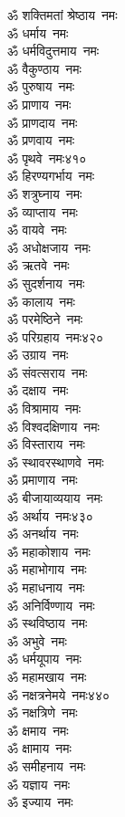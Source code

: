 \begin{multicols}{2}
\begin{flushleft}
ॐ शक्तिमतां श्रेष्ठाय~नमः\\
ॐ धर्माय~नमः\\
ॐ धर्मविदुत्तमाय~नमः\\
ॐ वैकुण्ठाय~नमः\\
ॐ पुरुषाय~नमः\\
ॐ प्राणाय~नमः\\
ॐ प्राणदाय~नमः\\
ॐ प्रणवाय~नमः\\
ॐ पृथवे~नमः\hfill ४१०\\
ॐ हिरण्यगर्भाय~नमः\\
ॐ शत्रुघ्नाय~नमः\\
ॐ व्याप्ताय~नमः\\
ॐ वायवे~नमः\\
ॐ अधोक्षजाय~नमः\\
ॐ ऋतवे~नमः\\
ॐ सुदर्शनाय~नमः\\
ॐ कालाय~नमः\\
ॐ परमेष्ठिने~नमः\\
ॐ परिग्रहाय~नमः\hfill ४२०\\
ॐ उग्राय~नमः\\
ॐ संवत्सराय~नमः\\
ॐ दक्षाय~नमः\\
ॐ विश्रामाय~नमः\\
ॐ विश्वदक्षिणाय~नमः\\
ॐ विस्ताराय~नमः\\
ॐ स्थावरस्थाणवे~नमः\\
ॐ प्रमाणाय~नमः\\
ॐ बीजायाव्ययाय~नमः\\
ॐ अर्थाय~नमः\hfill ४३०\\
ॐ अनर्थाय~नमः\\
ॐ महाकोशाय~नमः\\
ॐ महाभोगाय~नमः\\
ॐ महाधनाय~नमः\\
ॐ अनिर्विण्णाय~नमः\\
ॐ स्थविष्ठाय~नमः\\
ॐ अभुवे~नमः\\
ॐ धर्मयूपाय~नमः\\
ॐ महामखाय~नमः\\
ॐ नक्षत्रनेमये~नमः\hfill ४४०\\
ॐ नक्षत्रिणे~नमः\\
ॐ क्षमाय~नमः\\
ॐ क्षामाय~नमः\\
ॐ समीहनाय~नमः\\
ॐ यज्ञाय~नमः\\
ॐ इज्याय~नमः\\

\end{flushleft}
\end{multicols}
